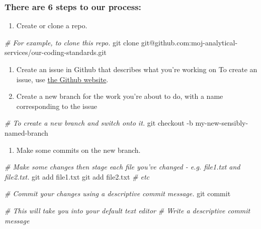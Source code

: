 \documentclass[]{book}
\newenvironment{Shaded}{\begin{snugshade}}{\end{snugshade}}
\newcommand{\CommentTok}[1]{\textcolor[rgb]{0.56,0.35,0.01}{\textit{#1}}}
\newcommand{\FunctionTok}[1]{\textcolor[rgb]{0.00,0.00,0.00}{#1}}
\newcommand{\NormalTok}[1]{#1}
\providecommand{\tightlist}{%
  \setlength{\itemsep}{0pt}\setlength{\parskip}{0pt}}
\begin{document}
\hypertarget{there-are-6-steps-to-our-process}{%
\subsubsection*{There are 6 steps to our process:}\label{there-are-6-steps-to-our-process}}

\begin{enumerate}
\def\labelenumi{\arabic{enumi}.}
\tightlist
\item
  Create or clone a repo.
\end{enumerate}

\begin{Shaded}
\begin{Highlighting}[]
\CommentTok{# For example, to clone this repo.}
\FunctionTok{git}\NormalTok{ clone git@github.com:moj-analytical-services/our-coding-standards.git}
\end{Highlighting}
\end{Shaded}

\begin{enumerate}
\def\labelenumi{\arabic{enumi}.}
\setcounter{enumi}{1}
\item
  Create an issue in Github that describes what you're working on
  To create an issue, use \href{https://guides.github.com/features/issues/}{the Github website}.
\item
  Create a new branch for the work you're about to do, with a name corresponding to the issue
\end{enumerate}

\begin{Shaded}
\begin{Highlighting}[]
\CommentTok{# To create a new branch and switch onto it.}
\FunctionTok{git}\NormalTok{ checkout -b my-new-sensibly-named-branch}
\end{Highlighting}
\end{Shaded}

\begin{enumerate}
\def\labelenumi{\arabic{enumi}.}
\setcounter{enumi}{3}
\tightlist
\item
  Make some commits on the new branch.
\end{enumerate}

\begin{Shaded}
\begin{Highlighting}[]
\CommentTok{# Make some changes then stage each file you've changed - e.g. file1.txt and file2.txt.}
\FunctionTok{git}\NormalTok{ add file1.txt}
\FunctionTok{git}\NormalTok{ add file2.txt}
\CommentTok{# etc}

\CommentTok{# Commit your changes using a descriptive commit message.}
\FunctionTok{git}\NormalTok{ commit}

\CommentTok{# This will take you into your default text editor}
\CommentTok{# Write a descriptive commit message}
\end{Highlighting}
\end{Shaded}
\end{document}
